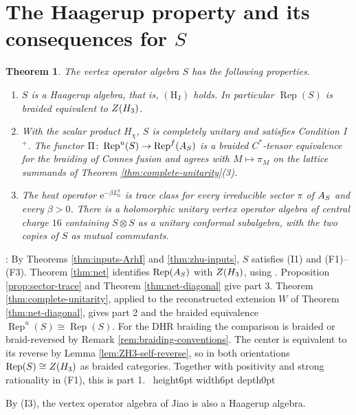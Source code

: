 \documentclass[leqno]{article}
\let\cal\relax
\newcommand{\cal}{\mathcal}
\newcommand{\qed}{\hfill \vrule height6pt  width6pt depth0pt}
\newcommand{\co}{\colon}
\newcommand{\ot}{\otimes}
\newcommand{\e}{\mathrm{e}}
\DeclareMathOperator{\Rep}{Rep}
\newtheorem{thm}{Theorem}[section]
\newenvironment{proof}[1][]{\noindent {\it Proof #1} : }{\hbox{~}\qed
\smallskip
}
\numberwithin{equation}{section}
\begin{document}
\section{The Haagerup property and its consequences for \texorpdfstring{$S$}{S}}
\label{sec:center}

\begin{thm}
\label{thm:HJ-main}
The vertex operator algebra $S$ has the following properties.
\begin{enumerate}
\item $S$ is a Haagerup algebra, that is, $\mathrm{(H_J)}$ holds. In particular $\Rep(S)$ is braided equivalent to $Z(\cal H_3)$.
\item With the scalar product $H_\chi$, $S$ is completely unitary and satisfies Condition I$^+$. The functor $\Pi\co\Rep^u(S)\to\Rep^f(\cal A_S)$ is a braided $C^*$-tensor equivalence for the braiding of Connes fusion and agrees with $M\mapsto\pi_M$ on the lattice summands of Theorem \ref{thm:complete-unitarity}(3).
\item The heat operator $\e^{-\beta L_0^\pi}$ is trace class for every irreducible sector $\pi$ of $\cal A_S$ and every $\beta>0$. There is a holomorphic unitary vertex operator algebra of central charge $16$ containing $S\ot S$ as a unitary conformal subalgebra, with the two copies of $S$ as mutual commutants.
\end{enumerate}
\end{thm}

\begin{proof}
By Theorems \ref{thm:inputs-ArhI} and \ref{thm:zhu-inputs}, $S$ satisfies (I1) and (F1)--(F3). Theorem \ref{thm:net} identifies $\Rep(\cal A_S)$ with $Z(\cal H_3)$, using \cite[Proposition 5.2 and Theorem 6.1]{ArhII}. Proposition \ref{prop:sector-trace} and Theorem \ref{thm:net-diagonal} give part 3. Theorem \ref{thm:complete-unitarity}, applied to the reconstructed extension $W$ of Theorem \ref{thm:net-diagonal}, gives part 2 and the braided equivalence $\Rep^u(S)\cong\Rep(S)$. For the DHR braiding the comparison is braided or braid-reversed by Remark \ref{rem:braiding-conventions}. The center is equivalent to its reverse by Lemma \ref{lem:ZH3-self-reverse}, so in both orientations $\Rep(S)\cong Z(\cal H_3)$ as braided categories. Together with positivity and strong rationality in (F1), this is part 1.
\end{proof}

By (I3), the vertex operator algebra of Jiao \cite{Jia26} is also a Haagerup algebra.
\end{document}
